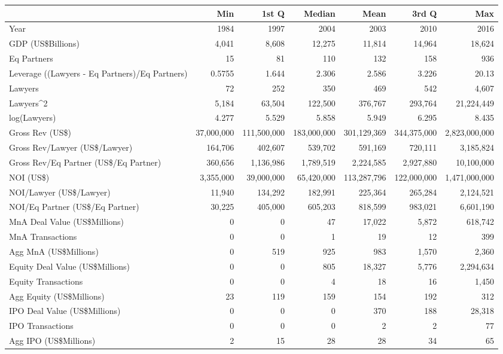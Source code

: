 \begin{table}[ht]
\centering
\begin{tabular}{lrrrrrr}
  \hline
 & Min & 1st Q & Median & Mean & 3rd Q & Max \\ 
  \hline
Year & 1984 & 1997 & 2004 & 2003 & 2010 & 2016 \\ 
  GDP (US\$Billions) & 4,041 & 8,608 & 12,275 & 11,814 & 14,964 & 18,624 \\ 
  Eq Partners & 15 & 81 & 110 & 132 & 158 & 936 \\ 
  Leverage ((Lawyers - Eq Partners)/Eq Partners) & 0.5755 & 1.644 & 2.306 & 2.586 & 3.226 & 20.13 \\ 
  Lawyers & 72 & 252 & 350 & 469 & 542 & 4,607 \\ 
  Lawyers^2 & 5,184 & 63,504 & 122,500 & 376,767 & 293,764 & 21,224,449 \\ 
  log(Lawyers) & 4.277 & 5.529 & 5.858 & 5.949 & 6.295 & 8.435 \\ 
   \hline
Gross Rev (US\$) & 37,000,000 & 111,500,000 & 183,000,000 & 301,129,369 & 344,375,000 & 2,823,000,000 \\ 
  Gross Rev/Lawyer (US\$/Lawyer) & 164,706 & 402,607 & 539,702 & 591,169 & 720,111 & 3,185,824 \\ 
  Gross Rev/Eq Partner (US\$/Eq Partner) & 360,656 & 1,136,986 & 1,789,519 & 2,224,585 & 2,927,880 & 10,100,000 \\ 
  NOI (US\$) & 3,355,000 & 39,000,000 & 65,420,000 & 113,287,796 & 122,000,000 & 1,471,000,000 \\ 
  NOI/Lawyer (US\$/Lawyer) & 11,940 & 134,292 & 182,991 & 225,364 & 265,284 & 2,124,521 \\ 
  NOI/Eq Partner (US\$/Eq Partner) & 30,225 & 405,000 & 605,203 & 818,599 & 983,021 & 6,601,190 \\ 
   \hline
MnA Deal Value (US\$Millions) & 0 & 0 & 47 & 17,022 & 5,872 & 618,742 \\ 
  MnA Transactions & 0 & 0 & 1 & 19 & 12 & 399 \\ 
  Agg MnA (US\$Millions) & 0 & 519 & 925 & 983 & 1,570 & 2,360 \\ 
   \hline
Equity Deal Value (US\$Millions) & 0 & 0 & 805 & 18,327 & 5,776 & 2,294,634 \\ 
  Equity  Transactions & 0 & 0 & 4 & 18 & 16 & 1,450 \\ 
  Agg Equity (US\$Millions) & 23 & 119 & 159 & 154 & 192 & 312 \\ 
   \hline
IPO Deal Value (US\$Millions) & 0 & 0 & 0 & 370 & 188 & 28,318 \\ 
  IPO  Transactions & 0 & 0 & 0 & 2 & 2 & 77 \\ 
  Agg IPO (US\$Millions) & 2 & 15 & 28 & 28 & 34 & 65 \\ 
   \hline
\end{tabular}
\end{table}
